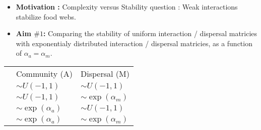 \documentclass[12pt]{article}
\begin{document}
\begin{itemize}

\item \textbf{Motivation : } Complexity versus Stability question : Weak interactions stabilize food webs.
\item \textbf{Aim $\#1$: } Comparing the stability of uniform interaction / dispersal matricies with exponentialy distributed interaction / dispersal matricies, as a function of $\alpha_a = \alpha_m$.
\end{itemize}
\begin{table}[!h]
\centering
\begin{tabular}{lll}
 & Community (A) & Dispersal (M)  \\
 & $\sim U(-1,1)$ & $\sim U(-1,1)$  \\
 & $\sim U(-1,1)$ & $\sim \exp(\alpha_m)$  \\
 & $\sim \exp(\alpha_a)$ & $\sim U(-1,1)$  \\
 & $\sim \exp(\alpha_a)$ & $\sim \exp(\alpha_m)$
\end{tabular}
\end{table}
\end{document}
